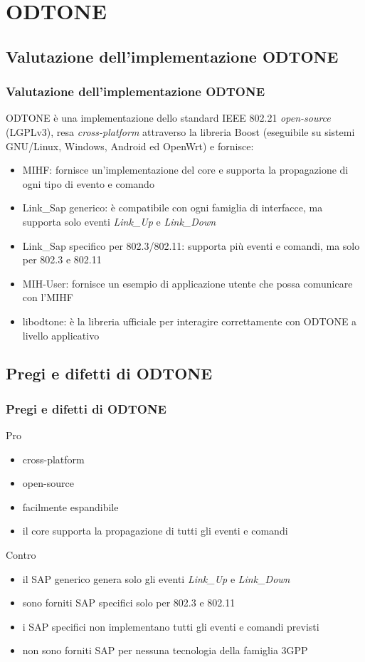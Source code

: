 \documentclass[10pt]{beamer}
\begin{document}
\section{ODTONE}
\subsection{Valutazione dell'implementazione ODTONE}
\begin{frame}
\frametitle{Valutazione dell'implementazione ODTONE}
ODTONE è una implementazione dello standard IEEE 802.21 {\em open-source} (LGPLv3), resa {\em cross-platform} attraverso la libreria Boost (eseguibile su sistemi GNU/Linux, Windows, Android ed OpenWrt) e fornisce:

\begin{itemize}

\item MIHF: fornisce un'implementazione del core e supporta la propagazione di ogni tipo di evento e comando
\item Link\_Sap generico: è compatibile con ogni famiglia di interfacce, ma supporta solo eventi {\em Link\_Up} e {\em Link\_Down}
\item Link\_Sap specifico per 802.3/802.11: supporta più eventi e comandi, ma solo per 802.3 e 802.11
\item MIH-User: fornisce un esempio di applicazione utente che possa comunicare con l'MIHF
\item libodtone: è la libreria ufficiale per interagire correttamente con ODTONE a livello applicativo
\end{itemize}


\end{frame}
\subsection{Pregi e difetti di ODTONE}
\begin{frame}
\frametitle{Pregi e difetti di ODTONE}
\begin{block}{Pro}

\begin{itemize}
\item cross-platform
\item open-source
\item facilmente espandibile
\item il core supporta la propagazione di tutti gli eventi e comandi
\end{itemize}
\end{block}

\begin{block}{Contro}
\begin{itemize}
\item il SAP generico genera solo gli eventi {\em Link\_Up} e {\em Link\_Down}
\item sono forniti SAP specifici solo per 802.3 e 802.11
\item i SAP specifici non implementano tutti gli eventi e comandi previsti
\item non sono forniti SAP per nessuna tecnologia della famiglia 3GPP
\end{itemize}
\end{block}
\end{frame}
\end{document}
